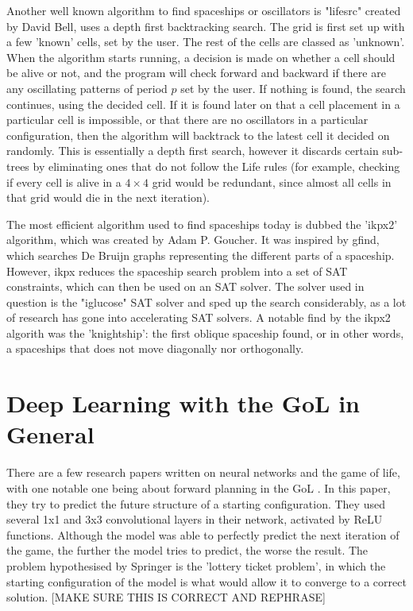 \documentclass{l4proj}
\begin{document}
Another well known algorithm to find spaceships or oscillators is "lifesrc" created by David Bell, uses a depth first backtracking search. The grid is first set up with a few 'known' cells, set by the user. The rest of the cells are classed as 'unknown'. When the algorithm starts running, a decision is made on whether a cell should be alive or not, and the program will check forward and backward if there are any oscillating patterns of period $p$ set by the user. If nothing is found, the search continues, using the decided cell. If it is found later on that a cell placement in a particular cell is impossible, or that there are no oscillators in a particular configuration, then the algorithm will backtrack to the latest cell it decided on randomly. This is essentially a depth first search, however it discards certain sub-trees by eliminating ones that do not follow the Life rules (for example, checking if every cell is alive in a $4 \times 4$ grid would be redundant, since almost all cells in that grid would die in the next iteration). 

The most efficient algorithm used to find spaceships today is dubbed the 'ikpx2' algorithm, which was created by Adam P. Goucher. It was inspired by gfind, which searches De Bruijn graphs representing the different parts of a spaceship. However, ikpx reduces the spaceship search problem into a set of SAT constraints, which can then be used on an SAT solver. The solver used in question is the "iglucose" \cite{sat_2018} SAT solver and sped up the search considerably, as a lot of research has gone into accelerating SAT solvers. A notable find by the ikpx2 algorith was the 'knightship': the first oblique spaceship found, or in other words, a spaceships that does not move diagonally nor orthogonally.

\section{Deep Learning with the GoL in General}

There are a few research papers written on neural networks and the game of life, with one notable one being about forward planning in the GoL \cite{game_of_life_dl_is_hard}. In this paper, they    try to predict the future structure of a starting configuration. They used several 1x1 and 3x3 convolutional layers in their network, activated by ReLU functions. Although the model was able to perfectly predict the next iteration of the game, the further the model tries to predict, the worse the result. The problem hypothesised by Springer is the 'lottery ticket problem', in which the starting configuration of the model is what would allow it to converge to a correct solution. [MAKE SURE THIS IS CORRECT AND REPHRASE]
\end{document}
